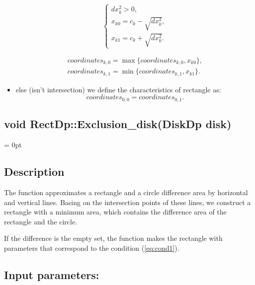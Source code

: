 \documentclass{report}
\begin{document}
\begin{itemize}
		\begin{equation}
			\begin{cases}
				dx_k^2 > 0,\\ 
				x_{k0} = c_k - \sqrt {dx_k^2},\\
				x_{k1} = c_k + \sqrt {dx_k^2}.
				\label{eq:l1l2}
			\end{cases}
		\end{equation}
	
		\begin{equation}
			\begin{gathered}
				coordinates_{k,0} = \max\{coordinates_{k,0}, x_{k0}\},\\
				coordinates_{k,1} = \min\{coordinates_{k,1},x_{k1}\}.
			\end{gathered}
		\end{equation}
		
		\item else (isn't intersection) we   define the characteristics of rectangle as:
			\begin{equation}
			coordinates_{0,0} = coordinates_{0,1}.
			\label{eq:empty}
		\end{equation}
		
	\end{itemize}
	
	\label{Difference}
	\begin{center} 
		\section*{void RectDp::Exclusion\_disk(DiskDp disk)}
	\end{center}
	\parindent = 0pt
	\subsection*{Description}
	
	The function approximates a rectangle and a circle difference area by horizontal and vertical lines. Basing on the intersection points of these lines, we construct a rectangle with a minimum area, which contains the difference area of the rectangle and the circle.
	
	If the difference is the empty set, the function makes the rectangle with parameters that correspond to the condition (\ref{eq:cond1}).
	
	\subsection*{Input parameters:}
	
\end{document}
